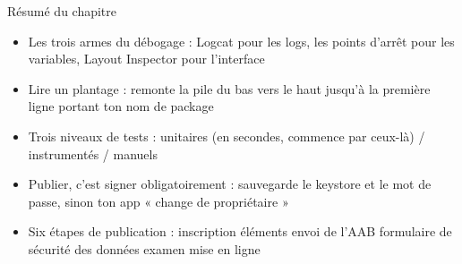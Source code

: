 \begin{tcbsummary}{Résumé du chapitre}
\begin{itemize}
  \item Les trois armes du débogage : Logcat pour les logs, les points d’arrêt pour les variables, Layout Inspector pour l’interface
  \item Lire un plantage : remonte la pile du bas vers le haut jusqu’à la première ligne portant ton nom de package
  \item Trois niveaux de tests : unitaires (en secondes, commence par ceux-là) / instrumentés / manuels
  \item Publier, c’est signer obligatoirement : sauvegarde le keystore et le mot de passe, sinon ton app « change de propriétaire »
  \item Six étapes de publication : inscription éléments envoi de l’AAB formulaire de sécurité des données examen mise en ligne
\end{itemize}

\end{tcbsummary}
